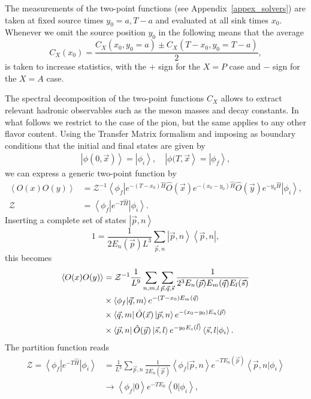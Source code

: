 The measurements of the two-point functions (see Appendix~\ref{appex_solvers}) are taken at fixed source times $y_0=a,T-a$ and evaluated at all sink times $x_0$. Whenever we omit the source position $y_0$ in the following means that the average
\begin{equation}
C_X(x_0)=\frac{C_X(x_0,y_0=a)\pm C_X(T-x_0,y_0=T-a)}{2},
\end{equation}
is taken to increase statistics, with the $+$ sign for the $X=P$ case and $-$ sign for the $X=A$ case.

The spectral decomposition of the two-point functions $C_X$ allows to extract relevant hadronic observables such as the meson masses and decay constants. In what follows we restrict to the case of the pion, but the same applies to any other flavor content. Using the Transfer Matrix formalism and imposing as boundary conditions that the initial and final states are given by
\begin{gather}
\left|\phi(0,\vec{x})\right>=\left|\phi_i\right>, \quad \left|\phi(T,\vec{x}\right>=\left|\phi_f\right>,
\end{gather}
we can express a generic two-point function by
\begin{align}
\label{ch_observables:eq:spectral}
\left<O(x)O(y)\right>&=\mathcal{Z}^{-1}\left<\phi_f\right|e^{-(T-x_0)\hat{H}}\hat{O}(\vec{x})e^{-(x_0-y_0)\hat{H}}\hat{O}(\vec{y})e^{-y_0\hat{H}}\left|\phi_i\right>, \\
\mathcal{Z}&=\left<\phi_f\right|e^{-T\hat{H}}\left|\phi_i\right>.
\end{align}
Inserting a complete set of states $\left|\vec{p},n\right>$
\begin{equation}
1=\frac{1}{2E_n(\vec{p})L^3}\sum_{\vec{p},n}\left|\vec{p},n\right>\left<\vec{p},n\right|,
\end{equation}
this becomes
\begin{align}
\left<O(x)O(y)\right>&=\mathcal{Z}^{-1}\frac{1}{L^9}\sum_{n,m,l}\sum_{\vec{p},\vec{q},\vec{s}}\frac{1}{2^3E_n(\vec{p})E_m(\vec{q})E_l(\vec{s})} \notag \\
&\times\left<\phi_f|\vec{q},m\right>e^{-(T-x_0)E_m(\vec{q})} \notag \\
&\times\left<\vec{q},m\right|\hat{O}(\vec{x})\left|\vec{p},n\right>e^{-(x_0-y_0)E_n(\vec{p})} \notag \\
&\times\left<\vec{p},n\right|\hat{O}(\vec{y})\left|\vec{s},l\right>e^{-y_0E_s(\vec{l})}\left<\vec{s},l|\phi_i\right>. 
\end{align}
The partition function reads
\begin{align}
\mathcal{Z}=\left<\phi_f\right|e^{-T\hat{H}}\left|\phi_i\right>&=\frac{1}{L^3}\sum_{\vec{p},n}\frac{1}{2E_n(\vec{p})}\left<\phi_f|\vec{p},n\right>e^{-TE_n(\vec{p})}\left<\vec{p},n|\phi_i\right>\\&\rightarrow\left<\phi_f|0\right>e^{-TE_0}\left<0|\phi_i\right>,
\end{align}
